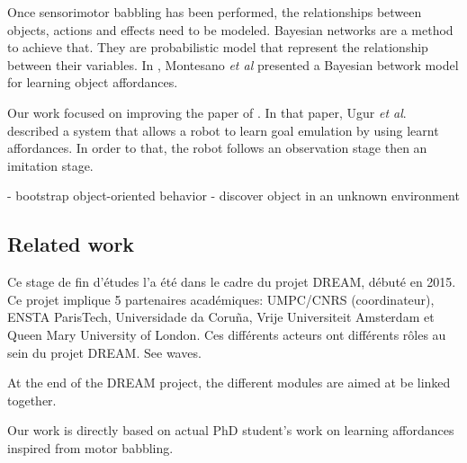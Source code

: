 \documentclass{llncs}
\begin{document}
Once sensorimotor babbling has been performed, the relationships between objects, actions and effects need to be modeled. Bayesian networks are a method to achieve that. They are probabilistic model that represent the relationship between their variables. In \cite{4456755}, Montesano \textit{et al} presented a Bayesian betwork model for learning object affordances.

Our work focused on improving the paper of \cite{Ugur2011}. In that paper, Ugur \textit{et al}.
described a system that allows a robot to learn goal emulation by using learnt affordances. In order to that, the robot follows an observation stage then an imitation stage.

- bootstrap object-oriented behavior
- discover object in an unknown environment

\subsection{Related work}

Ce stage de fin d'études l'a été dans le cadre du projet DREAM, débuté en 2015. Ce projet implique 5 partenaires académiques: UMPC/CNRS (coordinateur), ENSTA ParisTech, Universidade da Coruña, Vrije Universiteit Amsterdam et Queen Mary University of London. Ces différents acteurs ont différents rôles au sein du projet DREAM. See waves.

At the end of the DREAM project, the different modules are aimed at be linked together.

Our work is directly based on actual PhD student's work on learning affordances inspired from motor babbling.


\end{document}
